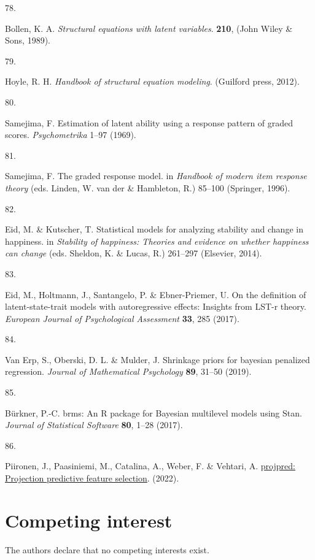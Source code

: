 \documentclass[
  man,floatsintext]{apa6}
\newlength{\cslhangindent}
\newlength{\csllabelwidth}
\newlength{\cslentryspacingunit} %
\newenvironment{CSLReferences}[2] %
 {%
  \setlength{\parindent}{0pt}
  \ifodd #1
  \let\oldpar\par
  \def\par{\hangindent=\cslhangindent\oldpar}
  \fi
  \setlength{\parskip}{#2\cslentryspacingunit}
 }%
 {}
\newcommand{\CSLLeftMargin}[1]{\parbox[t]{\csllabelwidth}{#1}}
\newcommand{\CSLRightInline}[1]{\parbox[t]{\linewidth - \csllabelwidth}{#1}\break}
\begin{document}
\begin{CSLReferences}{0}{0}
\leavevmode{}%
\CSLLeftMargin{78. }%
\CSLRightInline{Bollen, K. A. \emph{Structural equations with latent variables}. \textbf{210}, (John Wiley \& Sons, 1989).}

\leavevmode{}%
\CSLLeftMargin{79. }%
\CSLRightInline{Hoyle, R. H. \emph{Handbook of structural equation modeling}. (Guilford press, 2012).}

\leavevmode{}%
\CSLLeftMargin{80. }%
\CSLRightInline{Samejima, F. Estimation of latent ability using a response pattern of graded scores. \emph{Psychometrika} 1--97 (1969).}

\leavevmode{}%
\CSLLeftMargin{81. }%
\CSLRightInline{Samejima, F. The graded response model. in \emph{Handbook of modern item response theory} (eds. Linden, W. van der \& Hambleton, R.) 85--100 (Springer, 1996).}

\leavevmode{}%
\CSLLeftMargin{82. }%
\CSLRightInline{Eid, M. \& Kutscher, T. Statistical models for analyzing stability and change in happiness. in \emph{Stability of happiness: Theories and evidence on whether happiness can change} (eds. Sheldon, K. \& Lucas, R.) 261--297 (Elsevier, 2014).}

\leavevmode{}%
\CSLLeftMargin{83. }%
\CSLRightInline{Eid, M., Holtmann, J., Santangelo, P. \& Ebner-Priemer, U. On the definition of latent-state-trait models with autoregressive effects: Insights from LST-r theory. \emph{European Journal of Psychological Assessment} \textbf{33}, 285 (2017).}

\leavevmode{}%
\CSLLeftMargin{84. }%
\CSLRightInline{Van Erp, S., Oberski, D. L. \& Mulder, J. Shrinkage priors for bayesian penalized regression. \emph{Journal of Mathematical Psychology} \textbf{89}, 31--50 (2019).}

\leavevmode{}%
\CSLLeftMargin{85. }%
\CSLRightInline{Bürkner, P.-C. {brms}: An {R} package for {Bayesian} multilevel models using {Stan}. \emph{Journal of Statistical Software} \textbf{80}, 1--28 (2017).}

\leavevmode{}%
\CSLLeftMargin{86. }%
\CSLRightInline{Piironen, J., Paasiniemi, M., Catalina, A., Weber, F. \& Vehtari, A. \href{https://mc-stan.org/projpred/}{{projpred}: Projection predictive feature selection}. (2022).}

\end{CSLReferences}

\endgroup

\newpage

\hypertarget{competing-interest}{%
\section{Competing interest}\label{competing-interest}}

The authors declare that no competing interests exist.
\end{document}
